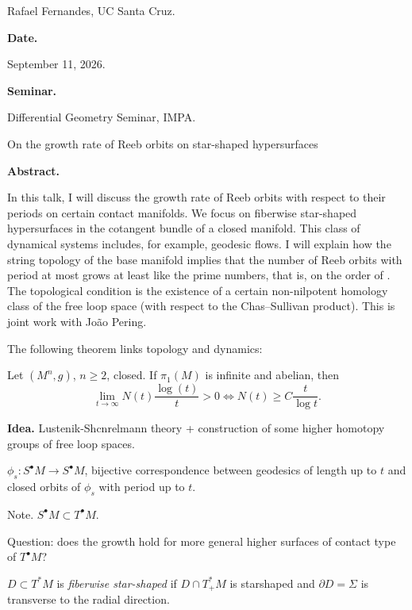 Rafael Fernandes, UC Santa Cruz.

\medskip\noindent
{\bf Date.}

September 11, 2026.

\medskip\noindent
{\bf Seminar.}

Differential Geometry Seminar, IMPA.

\medskip{} On the growth
rate of Reeb orbits on star-shaped
hypersurfaces


\medskip\noindent
{\bf Abstract.}

In this talk, I will discuss the growth rate
of Reeb orbits with respect to their periods
on certain contact manifolds. We focus on
fiberwise star-shaped hypersurfaces in the
cotangent bundle of a closed manifold. This
class of dynamical systems includes, for
example, geodesic flows. I will explain how
the string topology of the base manifold
implies that the number of Reeb orbits with
period at most grows at least like the prime
numbers, that is, on the order of . The
topological condition is the existence of a
certain non-nilpotent homology class of the
free loop space (with respect to the
Chas–Sullivan product). This is joint work
with João Pering.

\medskip\noindent
The following theorem links topology and
dynamics:

\begin{theorem}
\label{theorem-bangart-hingston}
Let $(M^n,g)$, $n \geq 2$, closed.
If $\pi_1(M)$ is infinite and abelian,
then
$$
\lim_{t \to \infty} N(t)
\frac{\operatorname{log}(t)}{t}>0
\iff
N(t) \geq C \frac{t}{\operatorname{log} t}.
$$
\end{theorem}

\noindent
{\bf Idea.} Lustenik-Shcnrelmann
theory + construction of
some higher homotopy groups of free loop
spaces.

$\phi_s:S^\bullet M \to S^\bullet M$, bijective
correspondence between geodesics of length
up to $t$ and closed orbits of $\phi_s$
with period up to $t$.

\medskip\noindent
Note. $S^\bullet M \subset T^\bullet M$.

\medskip\noindent
Question: does the growth hold for more
general higher surfaces of contact type of
$T^\bullet M$?

\begin{definition}
\label{definition-fiberwise-star-shaped}
$D \subset T^*M$ is {\it fiberwise
star-shaped} if $D \cap T^*_+M$ is
starshaped and $\partial D = \Sigma$ is
transverse to the radial direction.
\end{definition}

